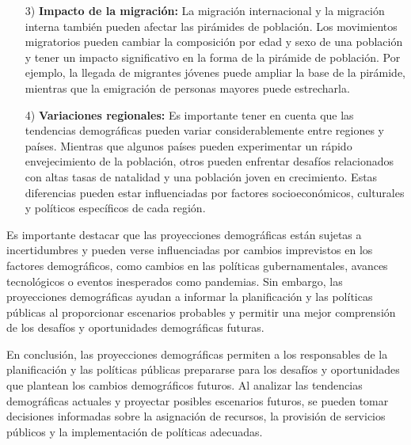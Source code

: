 \documentclass[8pt,a4paper]{beamer}
\begin{document}
{\begin{frame}{}
\begin{block}{}
\justifying

\begin{enumerate}
\justifying
\item[3)] \textbf{Impacto de la migración:} La migración internacional y la migración interna también pueden afectar las pirámides de población. Los movimientos migratorios pueden cambiar la composición por edad y sexo de una población y tener un impacto significativo en la forma de la pirámide de población. Por ejemplo, la llegada de migrantes jóvenes puede ampliar la base de la pirámide, mientras que la emigración de personas mayores puede estrecharla.

\item[4)] \textbf{Variaciones regionales:} Es importante tener en cuenta que las tendencias demográficas pueden variar considerablemente entre regiones y países. Mientras que algunos países pueden experimentar un rápido envejecimiento de la población, otros pueden enfrentar desafíos relacionados con altas tasas de natalidad y una población joven en crecimiento. Estas diferencias pueden estar influenciadas por factores socioeconómicos, culturales y políticos específicos de cada región.
\end{enumerate}
Es importante destacar que las proyecciones demográficas están sujetas a incertidumbres y pueden verse influenciadas por cambios imprevistos en los factores demográficos, como cambios en las políticas gubernamentales, avances tecnológicos o eventos inesperados como pandemias. Sin embargo, las proyecciones demográficas ayudan a informar la planificación y las políticas públicas al proporcionar escenarios probables y permitir una mejor comprensión de los desafíos y oportunidades demográficas futuras.
\end{block}
\end{frame}


\begin{frame}{}
\begin{block}{}
\justifying
En conclusión, las proyecciones demográficas permiten a los responsables de la planificación y las políticas públicas prepararse para los desafíos y oportunidades que plantean los cambios demográficos futuros. Al analizar las tendencias demográficas actuales y proyectar posibles escenarios futuros, se pueden tomar decisiones informadas sobre la asignación de recursos, la provisión de servicios públicos y la implementación de políticas adecuadas.


\end{block}
\end{frame}}
\end{document}
